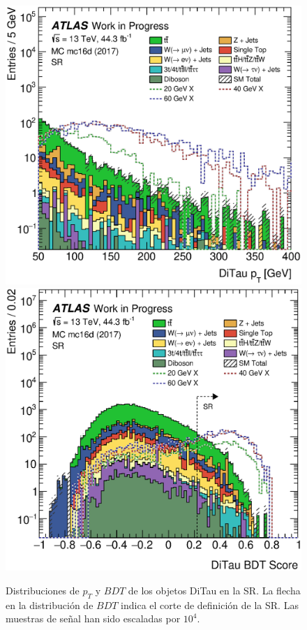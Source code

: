 \begin{figure}[t]
    \centering\noindent
    \includegraphics[width=0.49\fulllinewidth]{Assets/Plots/SR/h_stack_mc16d_ditau_pt.eps}
    \includegraphics[width=0.49\fulllinewidth]{Assets/Plots/SR/h_stack_mc16d_ditau_bdt.eps}

    \caption{Distribuciones de $p_T$ y $BDT$ de los objetos DiTau en la SR. La flecha en la distribución de $BDT$ indica el corte de definición de la SR. Las muestras de señal han sido escaladas por $10^4$.}
    \label{fig:ch4:SR:h_ditaus}
\end{figure}

